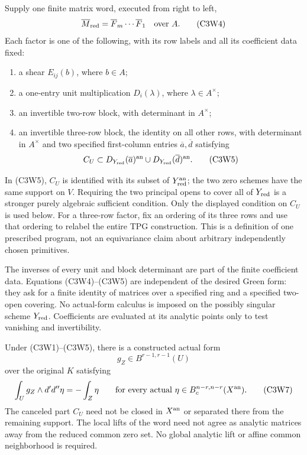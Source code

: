 Supply one finite matrix word, executed from right to left,
\[
              \overline M_{\rm red}
                    =\overline F_m\cdots\overline F_1
                                      \quad\hbox{over }A.
 \tag{C3W4}
\]
Each factor is one of the following, with its row labels and
all its coefficient data fixed:
\begin{enumerate}
\item a shear $E_{ij}(b)$, where $b\in A$;
\item a one-entry unit multiplication $D_i(\lambda)$, where
      $\lambda\in A^\times$;
\item an invertible two-row block, with determinant in $A^\times$;
\item an invertible three-row block, the identity on all other
      rows, with determinant in $A^\times$ and two specified
      first-column entries $\overline a,\overline d$ satisfying
\[
    C_U\subset
       D_{Y_{\rm red}}(\overline a)^{\rm an}
          \cup D_{Y_{\rm red}}(\overline d)^{\rm an}.
 \tag{C3W5}
\]
\end{enumerate}
In (C3W5), $C_U$ is identified with its subset of
$Y_{\rm red}^{\rm an}$; the two zero schemes have the same support
on $V$.  Requiring the two principal opens to cover all of
$Y_{\rm red}$ is a stronger purely algebraic sufficient condition.
Only the displayed condition on $C_U$ is used below.
For a three-row factor, fix an ordering of its three rows and use
that ordering to relabel the entire TPG construction.  This is a
definition of one prescribed program, not an equivariance claim
about arbitrary independently chosen primitives.

The inverses of every unit and block determinant are part of the
finite coefficient data.  Equations (C3W4)--(C3W5) are independent
of the desired Green form: they ask for a finite identity of
matrices over a specified ring and a specified two-open covering.
No actual-form calculus is imposed on the possibly singular
scheme $Y_{\rm red}$.  Coefficients are evaluated at its analytic
points only to test vanishing and invertibility.

\begin{theorem}
Under (C3W1)--(C3W5), there is a constructed actual form
\[
                         g_Z\in B^{r-1,r-1}(U)
 \tag{C3W6}
\]
over the original $K$ satisfying
\[
 \int_U g_Z\wedge d'd''\eta=-\int_Z\eta
       \qquad\hbox{for every actual }
       \eta\in B_c^{n-r,n-r}(X^{\rm an}).
 \tag{C3W7}
\]
The canceled part $C_U$ need not be closed in $X^{\rm an}$ or
separated there from the remaining support.  The local lifts of
the word need not agree as analytic matrices away from the reduced
common zero set.  No global analytic lift or affine common
neighborhood is required.
\end{theorem}

